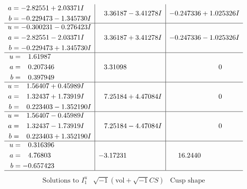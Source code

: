 \documentclass[1p]{elsarticle_modified}
\theoremstyle{definition}
\newcommand{\I}{\sqrt{-1}}
\begin{document}
$$\begin{array}{c|c|c}
\begin{aligned}
a &= -2.82551 + 2.03371 I \\
b &= -0.229473 - 1.345730 I\end{aligned}
 & \phantom{-}3.36187 - 3.41278 I & -0.247336 + 1.025326 I \\ \hline\begin{aligned}
u &= -0.300231 - 0.276423 I \\
a &= -2.82551 - 2.03371 I \\
b &= -0.229473 + 1.345730 I\end{aligned}
 & \phantom{-}3.36187 + 3.41278 I & -0.247336 - 1.025326 I \\ \hline\begin{aligned}
u &= \phantom{-}1.61987\phantom{ +0.000000I} \\
a &= \phantom{-}0.207346\phantom{ +0.000000I} \\
b &= \phantom{-}0.397949\phantom{ +0.000000I}\end{aligned}
 & \phantom{-}3.31098\phantom{ +0.000000I} & \phantom{-0.000000 } 0 \\ \hline\begin{aligned}
u &= \phantom{-}1.56407 + 0.45989 I \\
a &= \phantom{-}1.32437 + 1.73919 I \\
b &= \phantom{-}0.223403 - 1.352190 I\end{aligned}
 & \phantom{-}7.25184 + 4.47084 I & \phantom{-0.000000 } 0 \\ \hline\begin{aligned}
u &= \phantom{-}1.56407 - 0.45989 I \\
a &= \phantom{-}1.32437 - 1.73919 I \\
b &= \phantom{-}0.223403 + 1.352190 I\end{aligned}
 & \phantom{-}7.25184 - 4.47084 I & \phantom{-0.000000 } 0 \\ \hline\begin{aligned}
u &= \phantom{-}0.316396\phantom{ +0.000000I} \\
a &= \phantom{-}4.76803\phantom{ +0.000000I} \\
b &= -0.657423\phantom{ +0.000000I}\end{aligned}
 & -3.17231\phantom{ +0.000000I} & \phantom{-}16.2440\phantom{ +0.000000I}\\
 \hline 
 \end{array}$$\newpage$$\begin{array}{c|c|c}  
\text{Solutions to }I^u_{1}& \I (\text{vol} + \sqrt{-1}CS) & \text{Cusp shape}\\

\end{array}$$
\end{document}
